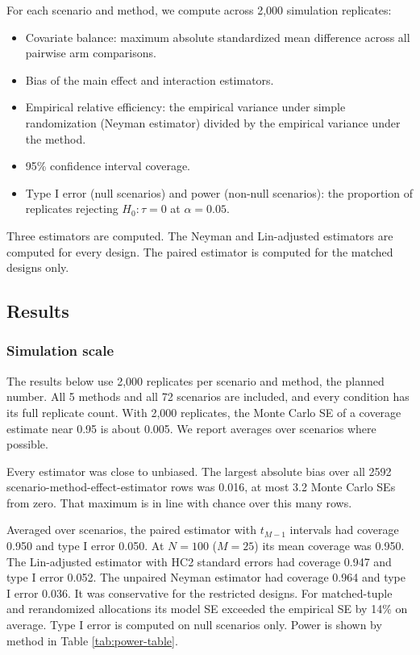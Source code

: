 \documentclass[
  11pt,
]{article}
\providecommand{\tightlist}{%
  \setlength{\itemsep}{0pt}\setlength{\parskip}{0pt}}
\begin{document}
For each scenario and method, we compute across
2,000 simulation replicates:

\begin{itemize}
\tightlist
\item
  Covariate balance: maximum absolute standardized mean
  difference across all pairwise arm comparisons.
\item
  Bias of the main effect and interaction estimators.
\item
  Empirical relative efficiency: the empirical variance
  under simple randomization (Neyman estimator) divided by
  the empirical variance under the method.
\item
  95\% confidence interval coverage.
\item
  Type I error (null scenarios) and power (non-null
  scenarios): the proportion of replicates rejecting
  \(H_0: \tau = 0\) at \(\alpha = 0.05\).
\end{itemize}

Three estimators are computed. The Neyman and
Lin-adjusted estimators are computed for every design. The
paired estimator is computed for the matched designs only.

\subsection{Results}\label{results}

\subsubsection{Simulation scale}\label{simulation-scale}

The results below use 2,000 replicates per
scenario and method, the
planned number. All
5 methods and all
72 scenarios are included,
and every condition has its full replicate count. With
2,000 replicates, the Monte Carlo SE of a
coverage estimate near 0.95 is about
0.005.
We report averages over scenarios where possible.

Every estimator was close to unbiased. The largest absolute
bias over all 2592 scenario-method-effect-estimator
rows was 0.016, at most
3.2 Monte Carlo SEs from zero.
That maximum is in line with chance over this many rows.

Averaged over scenarios, the paired estimator with \(t_{M-1}\)
intervals had coverage 0.950
and type I error 0.050. At
\(N = 100\) (\(M = 25\)) its mean coverage was
0.950. The Lin-adjusted estimator
with HC2 standard errors had coverage
0.947 and type I error
0.052. The unpaired Neyman
estimator had coverage 0.964
and type I error 0.036. It was
conservative for the restricted designs. For matched-tuple
and rerandomized allocations its model SE exceeded the
empirical SE by 14\%
on average. Type I error is computed on null scenarios
only. Power is shown by method in Table
\ref{tab:power-table}.
\end{document}

